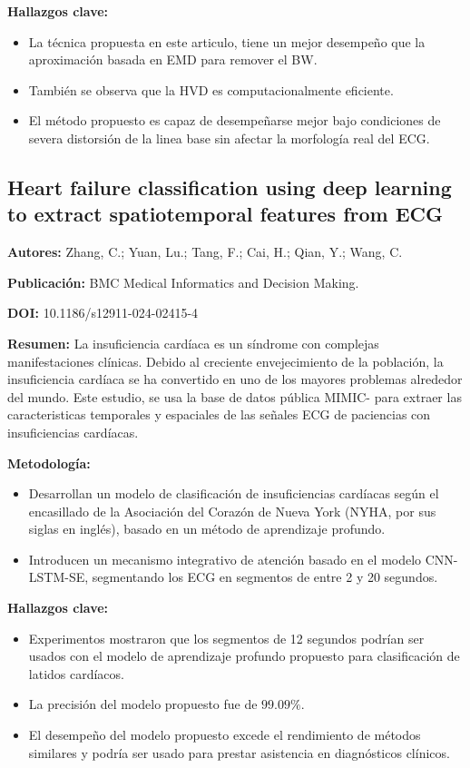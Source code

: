 \documentclass[12pt,letterpaper,oneside,openright]{book}
\begin{document}
\textbf{Hallazgos clave:}
\begin{itemize}
	\item La técnica propuesta en este articulo, tiene un mejor desempeño que la aproximación basada en EMD para remover el BW.
	\item También se observa que la HVD es computacionalmente eficiente. 
	\item El método propuesto es capaz de desempeñarse mejor bajo condiciones de severa distorsión de la linea base sin afectar la morfología real del ECG.
\end{itemize}

\subsection{Heart failure classification using deep learning to extract spatiotemporal features from ECG \cite{Zhang24}}
\textbf{Autores:} Zhang, C.; Yuan, Lu.; Tang, F.; Cai, H.; Qian, Y.; Wang, C.

\textbf{Publicación:} BMC Medical Informatics and Decision Making.

\textbf{DOI:} 10.1186/s12911-024-02415-4

\textbf{Resumen:} La insuficiencia cardíaca es un síndrome con complejas manifestaciones clínicas. Debido al creciente envejecimiento de la población, la insuficiencia cardíaca se ha convertido en uno de los mayores problemas alrededor del mundo. Este estudio, se usa la base de datos pública MIMIC- para extraer las caracteristicas temporales y espaciales de las señales ECG de paciencias con insuficiencias cardíacas.

\textbf{Metodología:}
\begin{itemize}
	\item Desarrollan un modelo de clasificación de insuficiencias cardíacas según el encasillado de la Asociación del Corazón de Nueva York (NYHA, por sus siglas en inglés), basado en un método de aprendizaje profundo.
	\item Introducen un mecanismo integrativo de atención basado en el modelo CNN-LSTM-SE, segmentando los ECG en segmentos de entre 2 y 20 segundos.
\end{itemize}

\textbf{Hallazgos clave:}
\begin{itemize}
	\item Experimentos mostraron que los segmentos de 12 segundos podrían ser usados con el modelo de aprendizaje profundo propuesto para clasificación de latidos cardíacos.
	\item La precisión del modelo propuesto fue de $99.09\%$.
	\item El desempeño del modelo propuesto excede el rendimiento de métodos similares y podría ser usado para prestar asistencia en diagnósticos clínicos.
\end{itemize}
\end{document}
